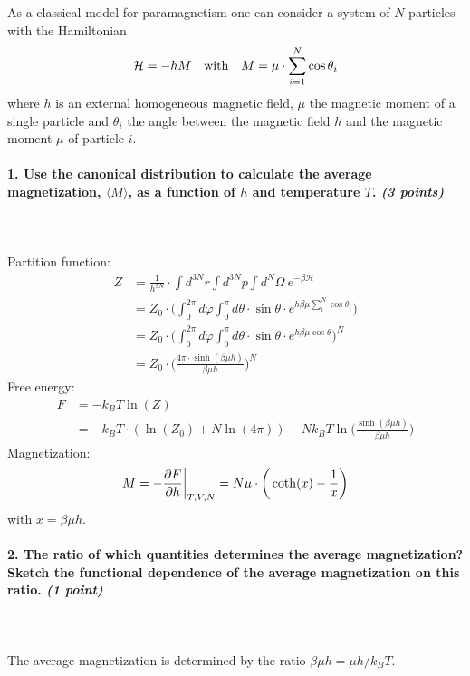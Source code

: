 As a classical model for paramagnetism one 
can consider a system of $N$ particles with 
the Hamiltonian
\begin{equation}
    \mathcal{H}=-hM
    \ \ \ \textnormal{with}\ \ \ 
    M=\mu\cdot\sum_{i=1}^N\cos\theta_i
\end{equation}
where $h$ is an external homogeneous magnetic 
field, $\mu$ the magnetic moment of a single 
particle and $\theta_i$ the angle between the
magnetic field $h$ and the magnetic moment
$\mu$ of particle $i$.

\paragraph{1. Use the canonical distribution 
    to calculate the average magnetization, 
    $\langle M\rangle$, as a function of $h$
    and temperature $T$. 
    \textit{(3 points)}
} \ \\
    \\
    Partition function:
    \begin{align}
        Z
        &=\frac{1}{h^{3N}}\cdot
        \int d^{3N}r 
        \int d^{3N}p
        \int d^N\Omega\
        e^{-\beta\mathcal{H}} \\
        &=Z_0\cdot\bigg(
            \int_0^{2\pi}d\varphi 
            \int_0^\pi d\theta
            \cdot\sin\theta\cdot 
            e^{h\beta\mu\sum_i^N\cos\theta_i}
        \bigg) \\
        &=Z_0\cdot\bigg(
            \int_0^{2\pi}d\varphi 
            \int_0^\pi d\theta
            \cdot\sin\theta\cdot 
            e^{h\beta\mu\cos\theta}
    \bigg)^N \\
        &=Z_0\cdot\bigg(
            \frac{4\pi\cdot\sinh(\beta\mu h)}
            {\beta\mu h}
        \bigg)^N
    \end{align}
    Free energy:
    \begin{align}
        F
        &=-k_BT\ln(Z) \\
        &=-k_BT\cdot(\ln(Z_0)+N\ln(4\pi))
        -Nk_BT\ln\bigg(
            \frac{\sinh(\beta\mu h)}{\beta\mu h}
        \bigg)
    \end{align}
    Magnetization:
    \begin{align}
        M
        =-\frac{\partial F}{\partial h}\bigg|_{T,V,N}
        =N\mu\cdot\bigg(\coth(x)
        -\frac{1}{x}\bigg)
    \end{align}
    with $x=\beta\mu h$.

\newpage
\paragraph{2. The ratio of which quantities 
    determines the average magnetization? 
    Sketch the functional dependence of the 
    average magnetization on this ratio. 
    \textit{(1 point)}
} \ \\
    \\
    The average magnetization is determined by 
    the ratio $\beta\mu h=\mu h/k_BT$.

